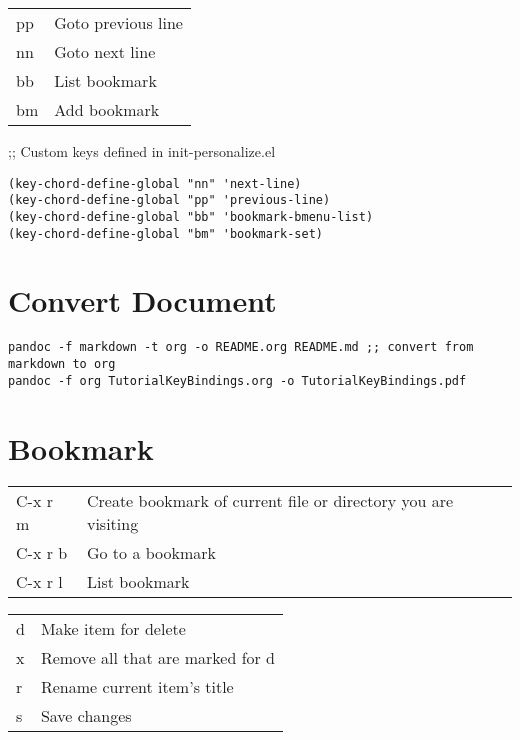 \documentclass[11pt]{article}
\begin{document}
\begin{center}
\begin{tabular}{ll}
\hline
pp & Goto previous line\\
nn & Goto next line\\
bb & List bookmark\\
bm & Add bookmark\\
\end{tabular}
\end{center}

;; Custom keys defined in init-personalize.el\\
\begin{verbatim}
(key-chord-define-global "nn" 'next-line)
(key-chord-define-global "pp" 'previous-line)
(key-chord-define-global "bb" 'bookmark-bmenu-list)
(key-chord-define-global "bm" 'bookmark-set)
\end{verbatim}

\section{Convert Document}
\label{sec:org98fc9fc}
\begin{verbatim}
pandoc -f markdown -t org -o README.org README.md ;; convert from markdown to org
pandoc -f org TutorialKeyBindings.org -o TutorialKeyBindings.pdf
\end{verbatim}

\section{Bookmark}
\label{sec:org840f922}
\begin{center}
\begin{tabular}{ll}
\hline
C-x r m & Create bookmark of current file or directory you are visiting\\
C-x r b & Go to a bookmark\\
C-x r l & List bookmark\\
\end{tabular}
\end{center}

\begin{center}
\begin{tabular}{ll}
\hline
d & Make item for delete\\
x & Remove all that are marked for d\\
r & Rename current item's title\\
s & Save changes\\
\end{tabular}
\end{center}
\end{document}
